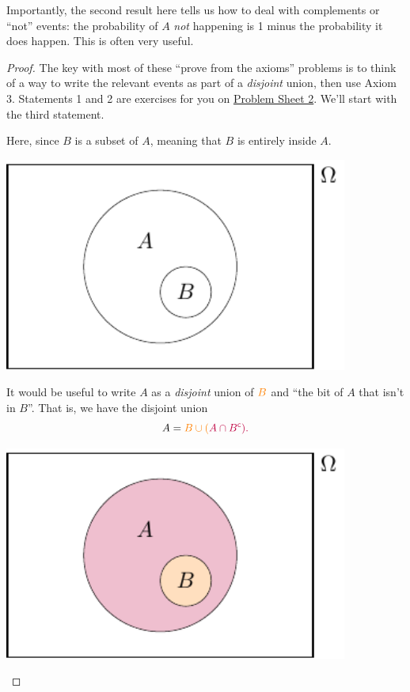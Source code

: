 \documentclass[
  a4paper,
]{book}
\theoremstyle{definition}
\theoremstyle{definition}
\theoremstyle{definition}
\theoremstyle{definition}
\theoremstyle{remark}
\begin{document}
Importantly, the second result here tells us how to deal with complements or ``not'' events: the probability of \(A\) \emph{not} happening is 1 minus the probability it does happen. This is often very useful.

\begin{proof}
The key with most of these ``prove from the axioms'' problems is to think of a way to write the relevant events as part of a \emph{disjoint} union, then use Axiom 3. Statements 1 and 2 are exercises for you on \protect\hyperlink{P2}{Problem Sheet 2}. We'll start with the third statement.

Here, since \(B\) is a subset of \(A\), meaning that \(B\) is entirely inside \(A\).

\begin{center}\includegraphics[width=320pt]{math1710_files/figure-latex/subs0-1} \end{center}

It would be useful to write \(A\) as a \emph{disjoint} union of \(\color{orange}B\) and {``the bit of \(A\) that isn't in \(B\)''}. That is, we have the disjoint union
\[ A = \color{orange}B \cup (\color{purple}{A \cap B^\mathsf{c}}) .\]

\begin{center}\includegraphics[width=320pt]{math1710_files/figure-latex/subs-1} \end{center}


\end{proof}
\end{document}
